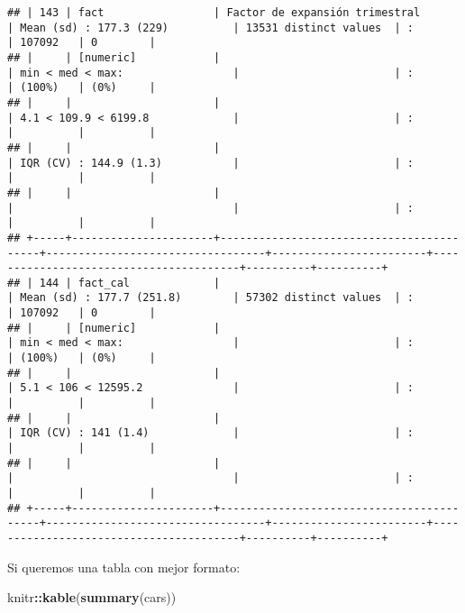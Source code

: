 \documentclass[]{article}
\newenvironment{Shaded}{\begin{snugshade}}{\end{snugshade}}
\newcommand{\KeywordTok}[1]{\textcolor[rgb]{0.13,0.29,0.53}{\textbf{#1}}}
\newcommand{\NormalTok}[1]{#1}
\newcommand{\OperatorTok}[1]{\textcolor[rgb]{0.81,0.36,0.00}{\textbf{#1}}}
\begin{document}
\begin{verbatim}
## | 143 | fact                 | Factor de expansión trimestral           | Mean (sd) : 177.3 (229)          | 13531 distinct values  | :                                      | 107092   | 0        |
## |     | [numeric]            |                                          | min < med < max:                 |                        | :                                      | (100%)   | (0%)     |
## |     |                      |                                          | 4.1 < 109.9 < 6199.8             |                        | :                                      |          |          |
## |     |                      |                                          | IQR (CV) : 144.9 (1.3)           |                        | :                                      |          |          |
## |     |                      |                                          |                                  |                        | :                                      |          |          |
## +-----+----------------------+------------------------------------------+----------------------------------+------------------------+----------------------------------------+----------+----------+
## | 144 | fact_cal             |                                          | Mean (sd) : 177.7 (251.8)        | 57302 distinct values  | :                                      | 107092   | 0        |
## |     | [numeric]            |                                          | min < med < max:                 |                        | :                                      | (100%)   | (0%)     |
## |     |                      |                                          | 5.1 < 106 < 12595.2              |                        | :                                      |          |          |
## |     |                      |                                          | IQR (CV) : 141 (1.4)             |                        | :                                      |          |          |
## |     |                      |                                          |                                  |                        | :                                      |          |          |
## +-----+----------------------+------------------------------------------+----------------------------------+------------------------+----------------------------------------+----------+----------+
\end{verbatim}

Si queremos una tabla con mejor formato:

\begin{Shaded}
\begin{Highlighting}[]
\NormalTok{knitr}\OperatorTok{::}\KeywordTok{kable}\NormalTok{(}\KeywordTok{summary}\NormalTok{(cars))}
\end{Highlighting}
\end{Shaded}
\end{document}
